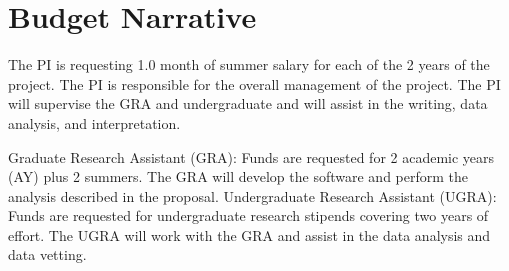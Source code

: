 \documentclass[12pt, preprint]{hacked-aastex}
\begin{document}


\clearpage
\section{Budget Narrative}\label{sec:budget}

 The PI is requesting 1.0 month of
summer salary for each of the 2 years of the project.  The PI is
responsible for the overall management of the project. The PI will
supervise the GRA and undergraduate and will assist in the writing,
data analysis, and interpretation.

Graduate Research Assistant (GRA): Funds are requested for 2 academic years
(AY) plus 2 summers. The GRA will develop the software and perform the
analysis described in the proposal. Undergraduate Research Assistant (UGRA): 
Funds  are requested for undergraduate research stipends covering two years of
effort. The UGRA will work with the GRA and assist in the data analysis 
and data vetting.
\end{document}
